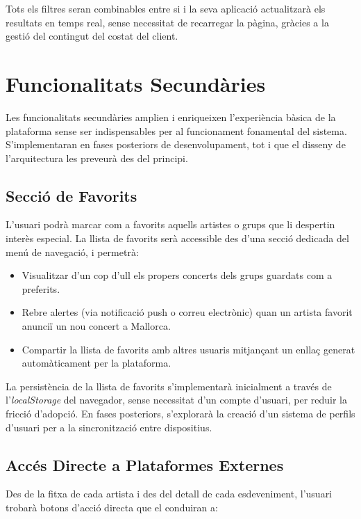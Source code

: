 Tots els filtres seran combinables entre si i la seva aplicació actualitzarà els resultats en temps real, sense necessitat de recarregar la pàgina, gràcies a la gestió del contingut del costat del client.

\section{Funcionalitats Secundàries}

Les funcionalitats secundàries amplien i enriqueixen l'experiència bàsica de la plataforma sense ser indispensables per al funcionament fonamental del sistema. S'implementaran en fases posteriors de desenvolupament, tot i que el disseny de l'arquitectura les preveurà des del principi.

\subsection{Secció de Favorits}

L'usuari podrà marcar com a favorits aquells artistes o grups que li despertin interès especial. La llista de favorits serà accessible des d'una secció dedicada del menú de navegació, i permetrà:

\begin{itemize}
    \item Visualitzar d'un cop d'ull els propers concerts dels grups guardats com a preferits.
    \item Rebre alertes (via notificació push o correu electrònic) quan un artista favorit anunciï un nou concert a Mallorca.
    \item Compartir la llista de favorits amb altres usuaris mitjançant un enllaç generat automàticament per la plataforma.
\end{itemize}

La persistència de la llista de favorits s'implementarà inicialment a través de l'\textit{localStorage} del navegador, sense necessitat d'un compte d'usuari, per reduir la fricció d'adopció. En fases posteriors, s'explorarà la creació d'un sistema de perfils d'usuari per a la sincronització entre dispositius.

\subsection{Accés Directe a Plataformes Externes}

Des de la fitxa de cada artista i des del detall de cada esdeveniment, l'usuari trobarà botons d'acció directa que el conduiran a:

